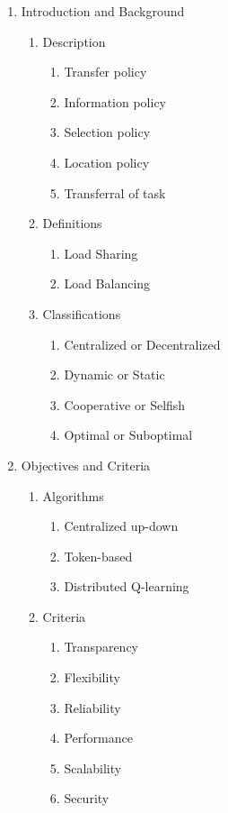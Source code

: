 \documentclass{slides}
\begin{document}
\begin{enumerate}
	\item Introduction and Background

	\begin{enumerate}

		\item Description
		\begin{enumerate}
			\item Transfer policy
			\item Information policy
			\item Selection policy
			\item Location policy
			\item Transferral of task
		\end{enumerate}
	
		\item Definitions
		\begin{enumerate}
			\item Load Sharing
			\item Load Balancing
		\end{enumerate}

		\item Classifications
		\begin{enumerate}
			\item Centralized or Decentralized
			\item Dynamic or Static
			\item Cooperative or Selfish
			\item Optimal or Suboptimal
		\end{enumerate}
	\end{enumerate}

	\item Objectives and Criteria

	\begin{enumerate}

		\item Algorithms
		\begin{enumerate}
			\item Centralized up-down
			\item Token-based
			\item Distributed Q-learning
		\end{enumerate}

		\item Criteria
		\begin{enumerate}
			\item Transparency
			\item Flexibility
			\item Reliability
			\item Performance
			\item Scalability
			\item Security
		\end{enumerate}


\end{enumerate}
\end{enumerate}
\end{document}
